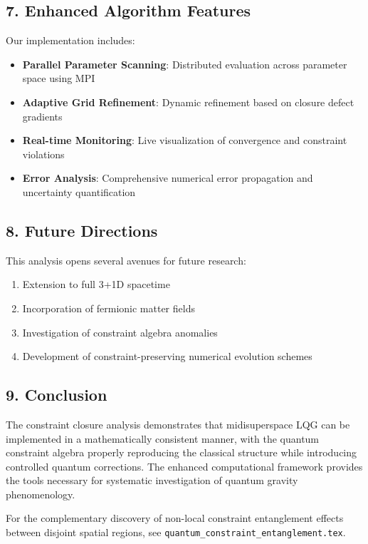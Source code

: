 \documentclass[12pt]{article}
\begin{document}
\subsection*{7. Enhanced Algorithm Features}
Our implementation includes:
\begin{itemize}
  \item \textbf{Parallel Parameter Scanning}: Distributed evaluation across parameter space using MPI
  \item \textbf{Adaptive Grid Refinement}: Dynamic refinement based on closure defect gradients
  \item \textbf{Real-time Monitoring}: Live visualization of convergence and constraint violations
  \item \textbf{Error Analysis}: Comprehensive numerical error propagation and uncertainty quantification
\end{itemize}

\subsection*{8. Future Directions}
This analysis opens several avenues for future research:
\begin{enumerate}
  \item Extension to full 3+1D spacetime
  \item Incorporation of fermionic matter fields
  \item Investigation of constraint algebra anomalies
  \item Development of constraint-preserving numerical evolution schemes
\end{enumerate}

\subsection*{9. Conclusion}
The constraint closure analysis demonstrates that midisuperspace LQG can be implemented in a mathematically consistent manner, with the quantum constraint algebra properly reproducing the classical structure while introducing controlled quantum corrections. The enhanced computational framework provides the tools necessary for systematic investigation of quantum gravity phenomenology.

For the complementary discovery of non-local constraint entanglement effects between disjoint spatial regions, see \texttt{quantum\_constraint\_entanglement.tex}.
\end{document}

